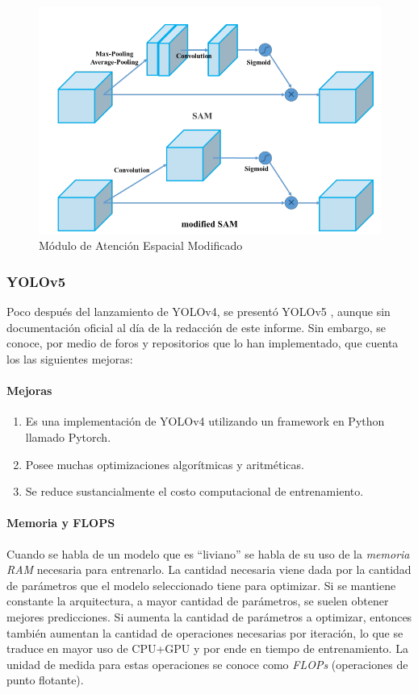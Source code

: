     \begin{figure}[h!]
        \centering
        \includegraphics[width=1\textwidth]{img/modifedsam.png}
        \caption{Módulo de Atención Espacial Modificado \cite{yolov4}}
        \label{fig:sam}
    \end{figure}

\subsubsection{YOLOv5}

Poco después del lanzamiento de YOLOv4, se presentó YOLOv5 \cite{yolov5}, aunque sin documentación oficial al día de la redacción de este informe. Sin embargo, se conoce, por medio de foros y repositorios que lo han implementado, que cuenta los las siguientes mejoras:
\paragraph{Mejoras}
     \begin{enumerate}
		\item Es una implementación de YOLOv4 utilizando un framework en Python llamado Pytorch.
		\item Posee muchas optimizaciones algorítmicas y aritméticas.
        \item Se reduce sustancialmente el costo computacional de entrenamiento.
     \end{enumerate}

\paragraph{Memoria y FLOPS}
Cuando se habla de un modelo que es “liviano” se habla de su uso de la \textit{memoria RAM} necesaria para entrenarlo.
La cantidad necesaria viene dada por la cantidad de parámetros que el modelo seleccionado tiene para optimizar.
Si se mantiene constante la arquitectura, a mayor cantidad de parámetros, se suelen obtener mejores predicciones.
Si aumenta la cantidad de parámetros a optimizar, entonces también aumentan la cantidad de operaciones necesarias por iteración, lo que se traduce en mayor uso de CPU+GPU y por ende en tiempo de entrenamiento.
La unidad de medida para estas operaciones se conoce como \textit{FLOPs} (operaciones de punto flotante).\\
\hfill \break

